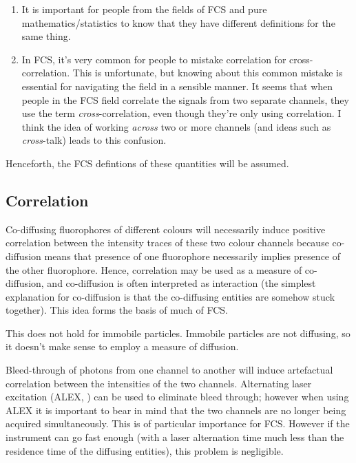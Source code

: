 \documentclass[12pt,]{book}
\providecommand{\tightlist}{%
  \setlength{\itemsep}{0pt}\setlength{\parskip}{0pt}}
\theoremstyle{definition}
\theoremstyle{definition}
\theoremstyle{definition}
\theoremstyle{remark}
\let\BeginKnitrBlock\begin \let\EndKnitrBlock\end
\begin{document}
\begin{enumerate}
\def\labelenumi{\arabic{enumi}.}
\tightlist
\item
  It is important for people from the fields of FCS and pure
  mathematics/statistics to know that they have different definitions
  for the same thing.
\item
  In FCS, it's very common for people to mistake correlation for
  cross-correlation. This is unfortunate, but knowing about this common
  mistake is essential for navigating the field in a sensible manner. It
  seems that when people in the FCS field correlate the signals from two
  separate channels, they use the term \emph{cross}-correlation, even
  though they're only using correlation. I think the idea of working
  \emph{across} two or more channels (and ideas such as
  \emph{cross}-talk) leads to this confusion.
\end{enumerate}

\BeginKnitrBlock{remark}
\iffalse{} {Remark. } \fi{}Henceforth, the FCS defintions of these
quantities will be assumed.
\EndKnitrBlock{remark}

\subsection{Correlation}\label{correlation}

Co-diffusing fluorophores of different colours will necessarily induce
positive correlation between the intensity traces of these two colour
channels because co-diffusion means that presence of one fluorophore
necessarily implies presence of the other fluorophore. Hence,
correlation may be used as a measure of co-diffusion, and co-diffusion
is often interpreted as interaction (the simplest explanation for
co-diffusion is that the co-diffusing entities are somehow stuck
together). This idea forms the basis of much of FCS.

This does not hold for immobile particles. Immobile particles are not
diffusing, so it doesn't make sense to employ a measure of diffusion.

Bleed-through of photons from one channel to another will induce
artefactual correlation between the intensities of the two channels.
Alternating laser excitation (ALEX, \citet{ALEX}) can be used to
eliminate bleed through; however when using ALEX it is important to bear
in mind that the two channels are no longer being acquired
simultaneously. This is of particular importance for FCS. However if the
instrument can go fast enough (with a laser alternation time much less
than the residence time of the diffusing entities), this problem is
negligible.
\end{document}

